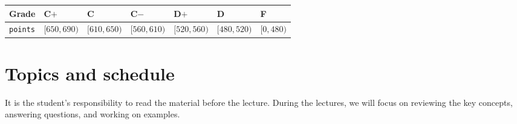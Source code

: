 \documentclass[11pt]{article}
\begin{document}
\begin{center}
\begin{tabular}{l|llllll}
\textbf{Grade} & C\(+\) & C & C\(-\) & D\(+\) & D & F\\[0pt]
\hline
\texttt{points} & \([650,690)\) & \([610,650)\) & \([560,610)\) & \([520,560)\) & \([480,520)\) & \([0,480)\)\\[0pt]
\end{tabular}
\end{center}

\section*{Topics and schedule}
\label{sec:org81bce6a}
It is the student's responsibility to read the material before the lecture.
During the lectures, we will focus on reviewing the key concepts, answering
questions, and working on examples.
\end{document}
